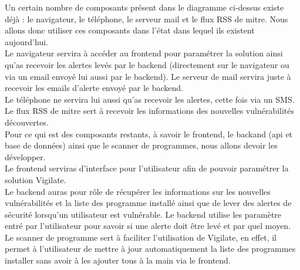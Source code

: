 Un certain nombre de composants présent dans le diagramme ci-dessus existe déjà : le navigateur, le téléphone, le serveur mail et le flux RSS de mitre. Nous allons donc utiliser ces composants dans l’état dans lequel ils existent aujourd’hui.\\
Le navigateur servira à accéder au frontend pour paramétrer la solution ainsi qu’as recevoir les alertes levés par le backend (directement sur le navigateur ou via un email envoyé lui aussi par le backend).
Le serveur de mail servira juste à recevoir les emails d’alerte envoyé par le backend.\\
Le téléphone ne servira lui aussi qu’as recevoir les alertes, cette fois via un SMS.\\
Le flux RSS de mitre sert à recevoir les informations des nouvelles vulnérabilités découvertes.\\
Pour ce qui est des composants restants, à savoir le frontend, le backand (api et base de données) ainsi que le scanner de programmes, nous allons devoir les développer.\\
Le frontend serviras d’interface pour l’utilisateur afin de pouvoir paramétrer la solution Vigilate.\\
Le backend auras pour rôle de récupérer les informations sur les nouvelles vulnérabilités et la liste des programme installé ainsi que de lever des alertes de sécurité lorsqu’un utilisateur est vulnérable. Le backend utilise les paramètre entré par l’utilisateur pour savoir si une alerte doit être levé et par quel moyen.\\
Le scanner de programme sert à faciliter l’utilisation de Vigilate, en effet, il permet à l’utilisateur de mettre à jour automatiquement la liste des programmes installer sans avoir à les ajouter tous à la main via le frontend.\\

